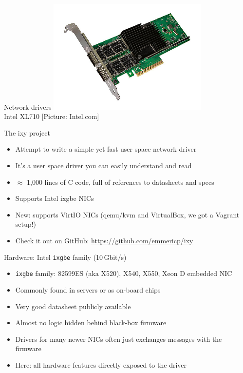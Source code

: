 \documentclass[NET,english,aspectratio=169,notitleframe,draft]{tumbeamer}
\begin{document}
\begin{frame}{Network drivers}
\centering\includegraphics[width=0.60\textwidth]{pics/nic3}\\
\vspace{-1em}\tiny{Intel XL710 [Picture: Intel.com]}
\end{frame}

\begin{frame}{The ixy project}
\begin{itemize}
\item Attempt to write a simple yet fast user space network driver
\item It's a user space driver you can easily understand and read
\item $\approx$ 1,000 lines of C code, full of references to datasheets and specs
\item Supports Intel ixgbe NICs %
\item New: supports VirtIO NICs (qemu/kvm and VirtualBox, we got a Vagrant setup!)
\item Check it out on GitHub: \url{https://github.com/emmericp/ixy}
\end{itemize}
\end{frame}

\begin{frame}{Hardware: Intel \texttt{ixgbe} family (10\,Gbit/s)}
\begin{itemize}
\item \texttt{ixgbe} family: 82599ES (aka X520), X540, X550, Xeon D embedded NIC
\item Commonly found in servers or as on-board chips
\item Very good datasheet publicly available
\vspace{1em}
\item Almost no logic hidden behind black-box firmware
\item<2-> Drivers for many newer NICs often just exchanges messages with the firmware
\item<2-> Here: all hardware features directly exposed to the driver
\end{itemize}
\end{frame}
\end{document}
